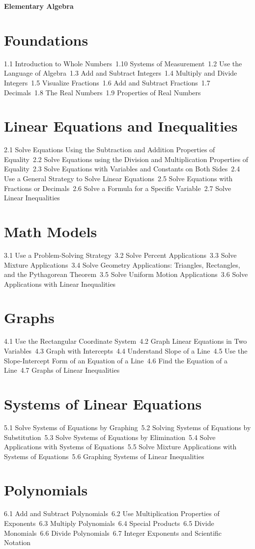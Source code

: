 {\LARGE \bf{Elementary Algebra}}
\section{Foundations}
1.1 Introduction to Whole Numbers\
1.10 Systems of Measurement\
1.2 Use the Language of Algebra\
1.3 Add and Subtract Integers\
1.4 Multiply and Divide Integers\
1.5 Visualize Fractions\
1.6 Add and Subtract Fractions\
1.7 Decimals\
1.8 The Real Numbers\
1.9 Properties of Real Numbers\
\section{Linear Equations and Inequalities}
2.1 Solve Equations Using the Subtraction and Addition Properties of Equality\
2.2 Solve Equations using the Division and Multiplication Properties of Equality\
2.3 Solve Equations with Variables and Constants on Both Sides\
2.4 Use a General Strategy to Solve Linear Equations\
2.5 Solve Equations with Fractions or Decimals\
2.6 Solve a Formula for a Specific Variable\
2.7 Solve Linear Inequalities\
\section{Math Models}
3.1 Use a Problem-Solving Strategy\
3.2 Solve Percent Applications\
3.3 Solve Mixture Applications\
3.4 Solve Geometry Applications: Triangles, Rectangles, and the Pythagorean Theorem\
3.5 Solve Uniform Motion Applications\
3.6 Solve Applications with Linear Inequalities\
\section{Graphs}
4.1 Use the Rectangular Coordinate System\
4.2 Graph  Linear Equations in Two Variables\
4.3 Graph with Intercepts\
4.4 Understand Slope of a Line\
4.5 Use the Slope-Intercept Form of an Equation of a Line\
4.6 Find the Equation of a Line\
4.7 Graphs of Linear Inequalities\
\section{Systems of Linear Equations}
5.1 Solve Systems of Equations by Graphing\
5.2 Solving Systems of Equations by Substitution\
5.3 Solve Systems of Equations by Elimination\
5.4 Solve Applications with Systems of Equations\
5.5 Solve Mixture Applications with Systems of Equations\
5.6 Graphing Systems of Linear Inequalities\
\section{Polynomials}
6.1 Add and Subtract Polynomials\
6.2 Use Multiplication Properties of Exponents\
6.3 Multiply Polynomials\
6.4 Special Products\
6.5 Divide Monomials\
6.6 Divide Polynomials\
6.7 Integer Exponents and Scientific Notation\
